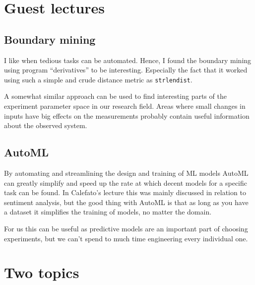 \documentclass[11pt]{article}
\begin{document}

\section*{Guest lectures}
\subsection*{Boundary mining}
I like when tedious tasks can be automated. Hence, I found the boundary mining using program ``derivatives'' to be interesting. Especially the fact that it worked using such a simple and crude distance metric as \texttt{strlendist}.

A somewhat similar approach can be used to find interesting parts of the experiment parameter space in our research field. Areas where small changes in inputs have big effects on the measurements probably contain useful information about the observed system.

\subsection*{AutoML}
By automating and streamlining the design and training of ML models AutoML can greatly simplify and speed up the rate at which decent models for a specific task can be found. In Calefato's lecture this was mainly discussed in relation to sentiment analysis, but the good thing with AutoML is that as long as you have a dataset it simplifies the training of models, no matter the domain.

For us this can be useful as predictive models are an important part of choosing experiments, but we can't spend to much time engineering every individual one.

\section*{Two topics}
\end{document}
